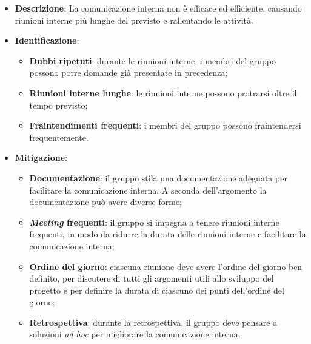 \label{risk:comunicazione interna carente}
\begin{itemize}
	\item \textbf{Descrizione}:
	      La comunicazione interna non è efficace ed efficiente, causando riunioni
	      interne più lunghe del previsto e rallentando le attività.
	\item \textbf{Identificazione}:
	      \begin{itemize}
		      \item \textbf{Dubbi ripetuti}: durante le riunioni interne, i
		            membri del gruppo possono porre domande già presentate in
		            precedenza;

		      \item \textbf{Riunioni interne lunghe}: le riunioni interne
		            possono protrarsi oltre il tempo previsto;

		      \item \textbf{Fraintendimenti frequenti}: i membri del gruppo
		            possono fraintendersi frequentemente.

	      \end{itemize}
	\item \textbf{Mitigazione}:
	      \begin{itemize}
		      \item \textbf{Documentazione}: il gruppo stila una documentazione
		            adeguata per facilitare la comunicazione interna. A seconda
		            dell'argomento la documentazione può avere diverse forme;

		      \item \textbf{\textit{Meeting} frequenti}: il gruppo si impegna a
		            tenere riunioni interne frequenti, in modo da ridurre la
		            durata delle riunioni interne e facilitare la comunicazione
		            interna;

		      \item \textbf{Ordine del giorno}: ciascuna riunione deve avere
		            l'ordine del
		            giorno ben definito, per discutere di tutti gli argomenti
		            utili allo sviluppo del progetto e per definire la durata di
		            ciascuno dei punti dell'ordine del giorno;

		      \item \textbf{Retrospettiva}: durante la retrospettiva, il gruppo
		            deve pensare a soluzioni \textit{ad hoc} per migliorare la
		            comunicazione interna.
	      \end{itemize}
\end{itemize}
